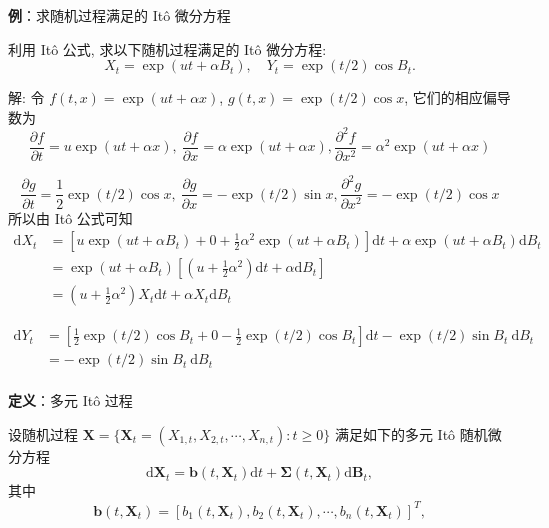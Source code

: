 \documentclass[openany]{ctexbook}
\theoremstyle{kaiti}
\theoremstyle{normal}
\begin{document}
\textbf{例}：求随机过程满足的 It\^o 微分方程

利用 It\^o 公式, 求以下随机过程满足的 It\^o 微分方程:
\begin{equation}X_t=\exp(ut+\alpha B_t),\quad Y_t=\exp(t/2)\cos B_t.\end{equation}

解:  令 $f(t,x)=\exp(ut+\alpha x)$, $g(t,x)=\exp(t/2)\cos x$, 它们的相应偏导数为
\begin{equation}
  \frac{\partial f}{\partial t}=u\exp(ut+\alpha x),~\frac{\partial f}{\partial x}=\alpha\exp(ut+\alpha x),\frac{\partial^2 f}{\partial x^2}=\alpha^2\exp(ut+\alpha x)
\end{equation}

\begin{equation}
  \frac{\partial g}{\partial t}=\frac{1}{2}\exp(t/2)\cos x,~\frac{\partial g}{\partial x}=-\exp(t/2)\sin x,\frac{\partial^2 g}{\partial x^2}=-\exp(t/2)\cos x
\end{equation}
所以由 It\^o 公式可知
\begin{equation}
  \begin{aligned}
    \mathrm{d}X_t&=\left[u\exp(ut+\alpha B_t)+0+\frac{1}{2}\alpha^2\exp(ut+\alpha B_t)\right]\mathrm{d}t+\alpha\exp(ut+\alpha B_t)\mathrm{d}B_t\\
    &=\exp(ut+\alpha B_t)\left[\left(u+\frac{1}{2}\alpha^2\right)\mathrm{d}t+\alpha\mathrm{d}B_t\right]\\
    &=\left(u+\frac{1}{2}\alpha^2\right)X_t\mathrm{d}t+\alpha X_t\mathrm{d}B_t
  \end{aligned}
\end{equation}

\begin{equation}
  \begin{aligned}
    \mathrm{d}Y_t&=\left[\frac{1}{2}\exp(t/2)\cos B_t+0-\frac{1}{2}\exp(t/2)\cos B_t\right]\mathrm{d}t-\exp(t/2)\sin B_t~\mathrm{d}B_t\\
    &=-\exp(t/2)\sin B_t~\mathrm{d}B_t\\
  \end{aligned}
\end{equation}

\textbf{定义}：多元 It\^o 过程

设随机过程 $\bm{X}=\{\bm{X}_t=(X_{1,t},X_{2,t},\cdots,X_{n,t}):t\geqslant0\}$ 满足如下的多元 It\^o 随机微分方程
\begin{equation}
  \mathrm{d}\bm{X}_t=\bm{b}(t,\bm{X}_t)\mathrm{d}t+\bm{\Sigma}(t,\bm{X}_t)\mathrm{d}\bm{B}_t,
\end{equation}
其中
\begin{equation}
  \bm{b}(t,\bm{X}_t)=[b_1(t,\bm{X}_t),b_2(t,\bm{X}_t),\cdots,b_n(t,\bm{X}_t)]^T,
\end{equation}
\end{document}
